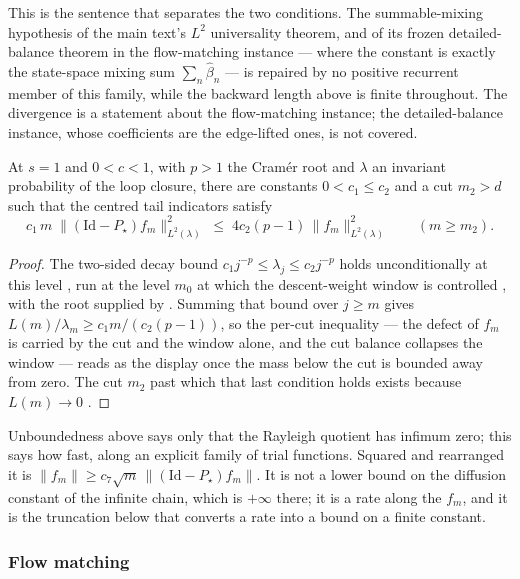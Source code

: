 \noindent This is the sentence that separates the two conditions. The summable-mixing hypothesis of the
main text's $L^2$ universality theorem, and of its frozen detailed-balance theorem in the
flow-matching instance --- where the constant is exactly the state-space mixing sum
$\sum_n\widehat\beta_n$ --- is repaired by no positive recurrent member of this family, while
the backward length above is finite throughout. The divergence is a statement about the
flow-matching instance; the detailed-balance instance, whose coefficients are the edge-lifted
ones, is not covered.


\begin{theorem}
  \label{thm:main_rate}
At $s=1$ and $0<c<1$, with $p>1$ the Cram\'er root and $\lambda$ an invariant probability of
the loop closure, there are constants $0<c_1\leq c_2$ and a cut $m_2>d$ such that the centred
tail indicators satisfy
\[ c_1\,m\;\bigl\|(\mathrm{Id}-P_\star)f_m\bigr\|^2_{L^2(\lambda)}
   \;\leq\; 4c_2(p-1)\,\|f_m\|^2_{L^2(\lambda)} \qquad (m\geq m_2). \]
\end{theorem}

\begin{proof}
The two-sided decay bound $c_1 j^{-p}\leq\lambda_j\leq c_2 j^{-p}$ holds unconditionally at
this level , run at the level $m_0$ at
which the descent-weight window is controlled , with the root
supplied by . Summing that bound over $j\geq m$ gives
$L(m)/\lambda_m\geq c_1m/(c_2(p-1))$, so the per-cut inequality --- the defect of $f_m$ is
carried by the cut and the window alone, and the cut balance collapses the window --- reads as
the display once the mass below the cut is bounded away from zero. The cut $m_2$ past which
that last condition holds exists because $L(m)\to0$
.
\end{proof}

\noindent Unboundedness above says only that the Rayleigh quotient has infimum zero; this says how fast,
along an explicit family of trial functions. Squared and rearranged it is
$\|f_m\|\geq c_7\sqrt m\,\|(\mathrm{Id}-P_\star)f_m\|$. It is not a lower bound on the
diffusion constant of the infinite chain, which is $+\infty$ there; it is a rate along the
$f_m$, and it is the truncation below that converts a rate into a bound on a finite constant.


\subsubsection{Flow matching}


